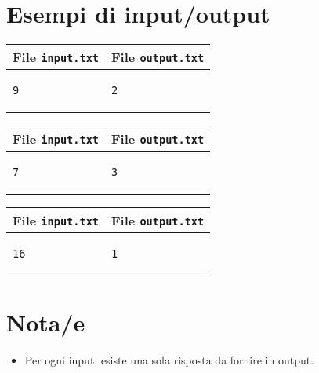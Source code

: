 \documentclass[a4paper,11pt]{article}
\begin{document}
\section*{Esempi di input/output}

  
    \noindent
    \begin{tabular}{p{11cm}|p{5cm}}
    \toprule
    \textbf{File \texttt{input.txt}}
    & \textbf{File \texttt{output.txt}}
    \\
    \midrule
    \scriptsize
    \begin{verbatim}
9
\end{verbatim}
    &
    \scriptsize
    \begin{verbatim}
2
\end{verbatim}
    \\
    \bottomrule
    \end{tabular}
  
    \noindent
    \begin{tabular}{p{11cm}|p{5cm}}
    \toprule
    \textbf{File \texttt{input.txt}}
    & \textbf{File \texttt{output.txt}}
    \\
    \midrule
    \scriptsize
    \begin{verbatim}
7
\end{verbatim}
    &
    \scriptsize
    \begin{verbatim}
3
\end{verbatim}
    \\
    \bottomrule
    \end{tabular}
  
    \noindent
    \begin{tabular}{p{11cm}|p{5cm}}
    \toprule
    \textbf{File \texttt{input.txt}}
    & \textbf{File \texttt{output.txt}}
    \\
    \midrule
    \scriptsize
    \begin{verbatim}
16
\end{verbatim}
    &
    \scriptsize
    \begin{verbatim}
1
\end{verbatim}
    \\
    \bottomrule
    \end{tabular}
  
\section*{Nota/e}
\begin{itemize}
  
    \item 
Per ogni input, esiste una sola risposta da fornire in output.

\end{itemize}
\end{document}
